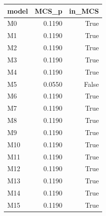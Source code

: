 \begin{tabular}{lrr}
\toprule
model & MCS_p & in_MCS \\
\midrule
M0 & 0.1190 & True \\
M1 & 0.1190 & True \\
M2 & 0.1190 & True \\
M3 & 0.1190 & True \\
M4 & 0.1190 & True \\
M5 & 0.0550 & False \\
M6 & 0.1190 & True \\
M7 & 0.1190 & True \\
M8 & 0.1190 & True \\
M9 & 0.1190 & True \\
M10 & 0.1190 & True \\
M11 & 0.1190 & True \\
M12 & 0.1190 & True \\
M13 & 0.1190 & True \\
M14 & 0.1190 & True \\
M15 & 0.1190 & True \\
\bottomrule
\end{tabular}
